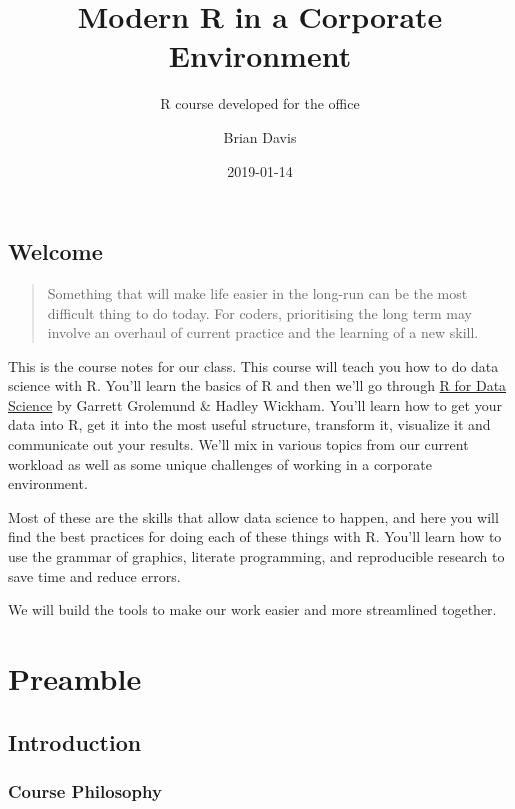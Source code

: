 \documentclass[]{book}
\title{Modern R in a Corporate Environment}
\subtitle{R course developed for the office}
\author{Brian Davis}
\date{2019-01-14}
\begin{document}
\maketitle

{
\setcounter{tocdepth}{1}
\tableofcontents
}
\chapter*{Welcome}\label{welcome}

\begin{quote}
Something that will make life easier in the long-run can be the most
difficult thing to do today. For coders, prioritising the long term may
involve an overhaul of current practice and the learning of a new skill.
\end{quote}

This is the course notes for our class. This course will teach you how
to do data science with R. You'll learn the basics of R and then we'll
go through \href{http://r4ds.had.co.nz/index.html}{R for Data Science}
by Garrett Grolemund \& Hadley Wickham. You'll learn how to get your
data into R, get it into the most useful structure, transform it,
visualize it and communicate out your results. We'll mix in various
topics from our current workload as well as some unique challenges of
working in a corporate environment.

Most of these are the skills that allow data science to happen, and here
you will find the best practices for doing each of these things with R.
You'll learn how to use the grammar of graphics, literate programming,
and reproducible research to save time and reduce errors.

We will build the tools to make our work easier and more streamlined
together.

\part{Preamble}\label{part-preamble}

\chapter{Introduction}\label{preamble-intro}

\section{Course Philosophy}\label{course-philosophy}
\end{document}
